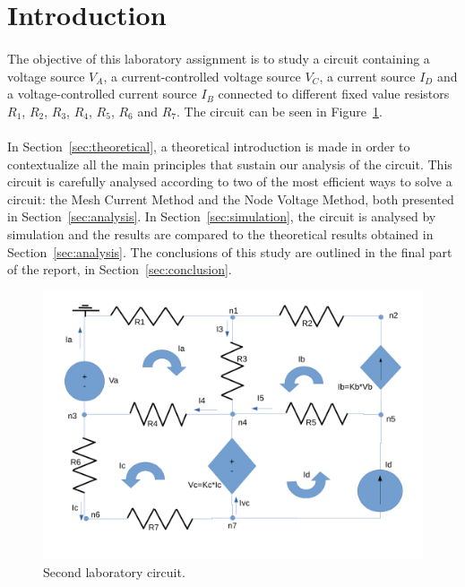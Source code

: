 \section{Introduction}
\label{sec:introduction}

\paragraph{} 
The objective of this laboratory assignment is to study a circuit containing a voltage source $V_A$, a current-controlled voltage source $V_C$, a current source $I_D$ and a voltage-controlled current source $I_B$ connected to different fixed value resistors $R_1$, $R_2$, $R_3$, $R_4$, $R_5$, $R_6$ and $R_7$. The circuit can be seen in Figure~\ref{fig:circuit}.

\paragraph{}
In Section~\ref{sec:theoretical}, a theoretical introduction is made in order to contextualize all the main principles that sustain our analysis of the circuit. This circuit is carefully analysed according to two of the most efficient ways to solve a circuit: the Mesh Current Method and the Node Voltage Method, both presented in Section~\ref{sec:analysis}. In Section~\ref{sec:simulation}, the circuit is analysed by simulation and the results are compared to the theoretical results obtained in Section~\ref{sec:analysis}. The conclusions of this study are outlined in the final part of the report, in Section~\ref{sec:conclusion}.

\begin{figure}[h] \centering
\includegraphics[width=0.8\linewidth]{circuit.pdf}
\caption{Second laboratory circuit.}
\label{fig:circuit}
\end{figure}

